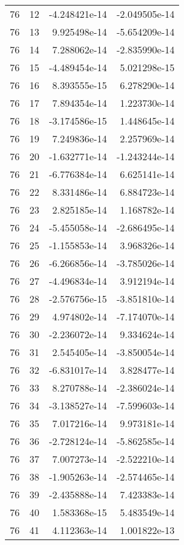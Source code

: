 \begin{tabular}{rrrr}
  76 &   12 & -4.248421e-14 & -2.049505e-14 \\
  76 &   13 &  9.925498e-14 & -5.654209e-14 \\
  76 &   14 &  7.288062e-14 & -2.835990e-14 \\
  76 &   15 & -4.489454e-14 &  5.021298e-15 \\
  76 &   16 &  8.393555e-15 &  6.278290e-14 \\
  76 &   17 &  7.894354e-14 &  1.223730e-14 \\
  76 &   18 & -3.174586e-15 &  1.448645e-14 \\
  76 &   19 &  7.249836e-14 &  2.257969e-14 \\
  76 &   20 & -1.632771e-14 & -1.243244e-14 \\
  76 &   21 & -6.776384e-14 &  6.625141e-14 \\
  76 &   22 &  8.331486e-14 &  6.884723e-14 \\
  76 &   23 &  2.825185e-14 &  1.168782e-14 \\
  76 &   24 & -5.455058e-14 & -2.686495e-14 \\
  76 &   25 & -1.155853e-14 &  3.968326e-14 \\
  76 &   26 & -6.266856e-14 & -3.785026e-14 \\
  76 &   27 & -4.496834e-14 &  3.912194e-14 \\
  76 &   28 & -2.576756e-15 & -3.851810e-14 \\
  76 &   29 &  4.974802e-14 & -7.174070e-14 \\
  76 &   30 & -2.236072e-14 &  9.334624e-14 \\
  76 &   31 &  2.545405e-14 & -3.850054e-14 \\
  76 &   32 & -6.831017e-14 &  3.828477e-14 \\
  76 &   33 &  8.270788e-14 & -2.386024e-14 \\
  76 &   34 & -3.138527e-14 & -7.599603e-14 \\
  76 &   35 &  7.017216e-14 &  9.973181e-14 \\
  76 &   36 & -2.728124e-14 & -5.862585e-14 \\
  76 &   37 &  7.007273e-14 & -2.522210e-14 \\
  76 &   38 & -1.905263e-14 & -2.574465e-14 \\
  76 &   39 & -2.435888e-14 &  7.423383e-14 \\
  76 &   40 &  1.583368e-15 &  5.483549e-14 \\
  76 &   41 &  4.112363e-14 &  1.001822e-13 \\

\end{tabular}
